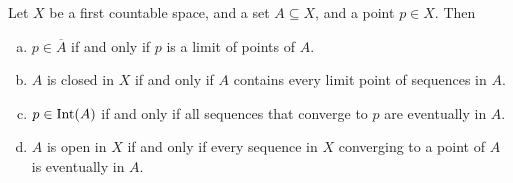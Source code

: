 \begin{lemma}\label{lem: sequence lemma}
  Let \(X\) be a first countable space, and a set \(A \subseteq X\), and a point
  \(p \in X\). Then
  \begin{enumerate}[(a)]
    \item \(p \in \overline A\) if and only if \(p\) is a limit of points of
      \(A\).
    \item \(A\) is closed in \(X\) if and only if \(A\) contains every limit
      point of sequences in \(A\).
    \item \(p \in \operatorname{Int}(A)\) if and only if all sequences that converge to
      \(p\) are eventually in \(A\).
    \item \(A\) is open in \(X\) if and only if every sequence in \(X\)
      converging to a point of \(A\) is eventually in \(A\).
  \end{enumerate}
\end{lemma}

